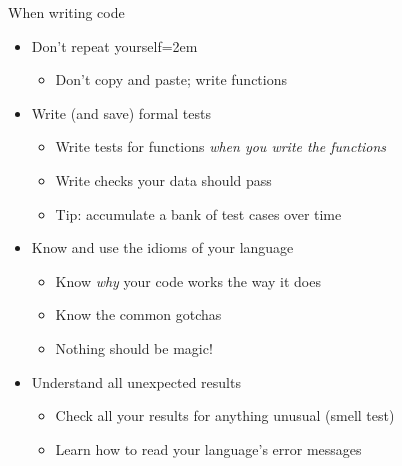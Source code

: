 \documentclass[handout]{beamer}
\begin{document}
\begin{frame}{When writing code}
    \begin{itemize}
        \item Don't repeat yourself\itemsep=2em
        \begin{itemize}
            \item Don't copy and paste; write functions
        \end{itemize}
        \item<2-> Write (and save) formal tests
        \begin{itemize}
            \item Write tests for functions \textit{when you write the functions}
            \item Write checks your data should pass
            \item Tip: accumulate a bank of test cases over time
        \end{itemize}
        \item<3-> Know and use the idioms of your language
        \begin{itemize}
            \item Know \textit{why} your code works the way it does
            \item Know the common gotchas
            \item Nothing should be magic!
        \end{itemize}
        \item<4-> Understand all unexpected results
        \begin{itemize}
            \item Check all your results for anything unusual (smell test)
            \item Learn how to read your language's error messages
        \end{itemize}
    \end{itemize}
\end{frame}
\end{document}
